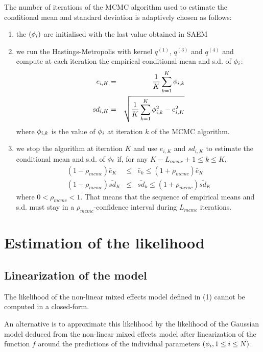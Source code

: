 The number of iterations of the MCMC algorithm used to estimate the conditional mean and standard deviation is adaptively chosen as follows:
\begin{enumerate}
  \item the $({\phi}_i)$ are initialised with the last value obtained in SAEM
  \item we run the Hastings-Metropolis with kernel $q^{(1)}$, $q^{(3)}$ and $q^{(4)}$ and compute at each iteration the empirical conditional mean and s.d. of ${\phi}_i$:
  \begin{eqnarray}
  e_{i,K} &= &\frac{1}{K}\sum_{k=1}^K {\phi}_{i,k} \\
  sd_{i,K} &= &\sqrt{\frac{1}{K}\sum_{k=1}^K {\phi}_{i,k}^2 - e_{i,K}^2 }
  \end{eqnarray}
  where ${\phi}_{i,k}$ is the value of ${\phi}_i$ at iteration $k$ of the MCMC algorithm.
  \item we stop the algorithm at iteration $K$ and use $e_{i,K}$ and $sd_{i,K}$ to estimate the conditional mean and s.d. of ${\phi}_i$ if, for any $ K-L_{mcmc}+1 \leq k \leq K$,
  \begin{eqnarray}
  \label{Lmcmc}  (1-\rho_{mcmc})\bar{e}_K & \leq & \bar{e}_k \leq  (1+\rho_{mcmc})\bar{e}_{K} \\
  \nonumber  (1-\rho_{mcmc})\bar{sd}_{K} & \leq & \bar{sd}_{k} \leq  (1+\rho_{mcmc})\bar{sd}_{K}
  \end{eqnarray}
where $0<\rho_{mcmc}<1$. That means that the sequence of empirical means and s.d. must stay in a $\rho_{mcmc}$-confidence interval during $L_{mcmc}$ iterations.
\end{enumerate}

\section{Estimation of the likelihood} \label{estilik}
\subsection{Linearization of the model}
The likelihood of the non-linear mixed effects model defined in (1) cannot be computed in a closed-form.

An alternative is  to approximate this likelihood  by the likelihood of the Gaussian model deduced from the non-linear mixed
effects model after linearization of the function $f$ around
the predictions of the individual parameters $({{\phi}_i}, 1\leq i \leq N) $.


